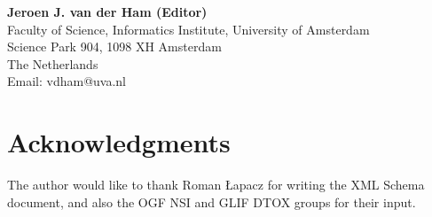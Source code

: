 \documentclass[12pt]{article}  %
\begin{document}
\textbf{Jeroen J. van der Ham (Editor)} \\
Faculty of Science, Informatics Institute, University of Amsterdam \\
Science Park 904, 1098 XH  Amsterdam  \\
The Netherlands \\
Email: vdham@uva.nl \\
\section{Acknowledgments}

The author would like to thank Roman Łapacz for writing the XML Schema document, and also the OGF NSI and GLIF DTOX groups for their input.


 
 

\pagebreak
\appendix
	
	
\end{document}
